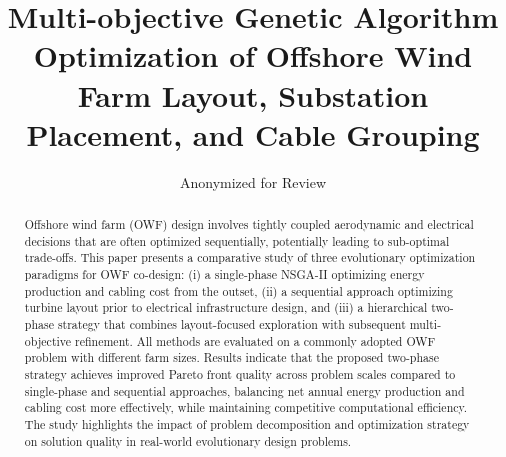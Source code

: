 \documentclass[format=sigconf,anonymous=true,review=true]{acmart}
\begin{document}
\title{Multi-objective Genetic Algorithm Optimization of Offshore Wind Farm Layout, Substation Placement, and Cable Grouping}


\author{Anonymized for Review}

\renewcommand{\shortauthors}{Anonymized et al.}

\begin{abstract}
Offshore wind farm (OWF) design involves tightly coupled aerodynamic and electrical decisions that are often optimized sequentially, potentially leading to sub-optimal trade-offs. This paper presents a comparative study of three evolutionary optimization paradigms for OWF co-design: (i) a single-phase NSGA-II optimizing energy production and cabling cost from the outset, (ii) a sequential approach optimizing turbine layout prior to electrical infrastructure design, and (iii) a hierarchical two-phase strategy that combines layout-focused exploration with subsequent multi-objective refinement. All methods are evaluated on a commonly adopted OWF problem with different farm sizes. Results indicate that the proposed two-phase strategy achieves improved Pareto front quality across problem scales compared to single-phase and sequential approaches, balancing net annual energy production and cabling cost more effectively, while maintaining competitive computational efficiency. The study highlights the impact of problem decomposition and optimization strategy on solution quality in real-world evolutionary design problems.
\end{abstract}



\end{document}
